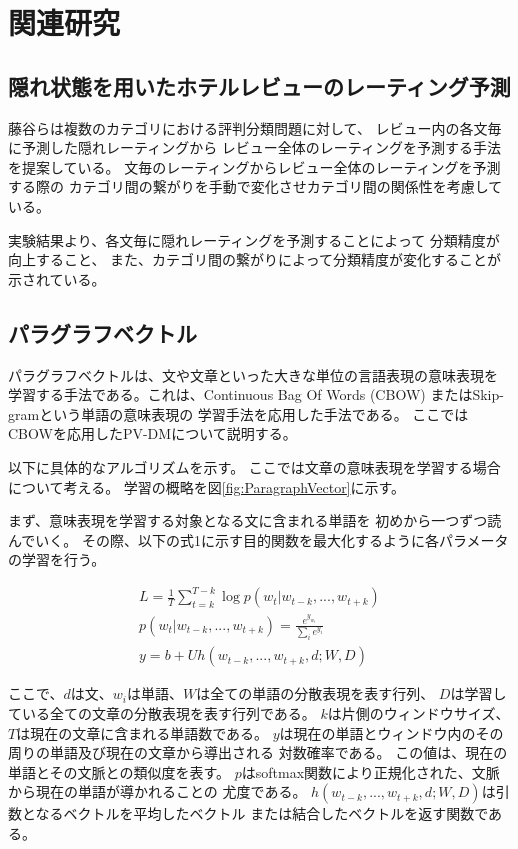 \documentclass[twocolumn,a4paper]{ltjarticle}
\begin{document}
\section{関連研究}

\subsection{隠れ状態を用いたホテルレビューのレーティング予測}

藤谷ら\cite{fujitani15}は複数のカテゴリにおける評判分類問題に対して、
レビュー内の各文毎に予測した隠れレーティングから
レビュー全体のレーティングを予測する手法を提案している。
文毎のレーティングからレビュー全体のレーティングを予測する際の
カテゴリ間の繋がりを手動で変化させカテゴリ間の関係性を考慮している。

実験結果より、各文毎に隠れレーティングを予測することによって
分類精度が向上すること、
また、カテゴリ間の繋がりによって分類精度が変化することが示されている。


\subsection{パラグラフベクトル}

パラグラフベクトルは、文や文章といった大きな単位の言語表現の意味表現を
学習する手法である。これは、Continuous Bag Of Words (CBOW)
またはSkip-gramという単語の意味表現の 学習手法を応用した手法である。
ここではCBOWを応用したPV-DMについて説明する。

以下に具体的なアルゴリズムを示す。
ここでは文章の意味表現を学習する場合について考える。
学習の概略を図\ref{fig:ParagraphVector}に示す。

まず、意味表現を学習する対象となる文に含まれる単語を
初めから一つずつ読んでいく。
その際、以下の式1に示す目的関数を最大化するように各パラメータの学習を行う。

\begin{gather}
  L = \frac{1}{T} \sum^{T - k}_{t = k} \log p(w_t | w_{t-k}, ..., w_{t+k}) \\
  p(w_t | w_{t-k}, ..., w_{t+k}) = \frac{e^{y_{w_t}}}{\sum_i e^{y_i}} \\
  y = b + Uh(w_{t-k}, ..., w_{t+k}, d; W, D)
\end{gather}

ここで、$d$は文、$w_i$は単語、$W$は全ての単語の分散表現を表す行列、
$D$は学習している全ての文章の分散表現を表す行列である。
$k$は片側のウィンドウサイズ、
$T$は現在の文章に含まれる単語数である。
$y$は現在の単語とウィンドウ内のその周りの単語及び現在の文章から導出される
対数確率である。 この値は、現在の単語とその文脈との類似度を表す。
$p$はsoftmax関数により正規化された、文脈から現在の単語が導かれることの
尤度である。
$h(w_{t-k}, ..., w_{t+k}, d; W, D)$は引数となるベクトルを平均したベクトル
または結合したベクトルを返す関数である。
\end{document}
